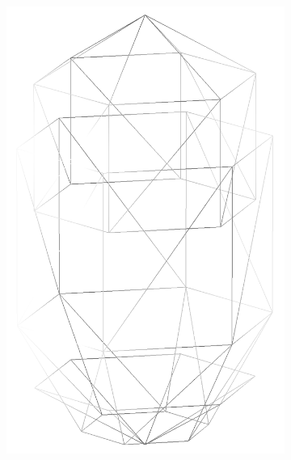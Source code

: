 \begin{figure}
\begin{center}
\begin{subfigure}{0.2\textwidth}
    \includegraphics[width=\linewidth]{assets/images/shapes/bugold/bad_mesh_low_w}
    \caption{}
    \end{subfigure}
  \end{center}
  \caption{}
  \label{fig:bad_spherocylinder_old}
\end{figure}
